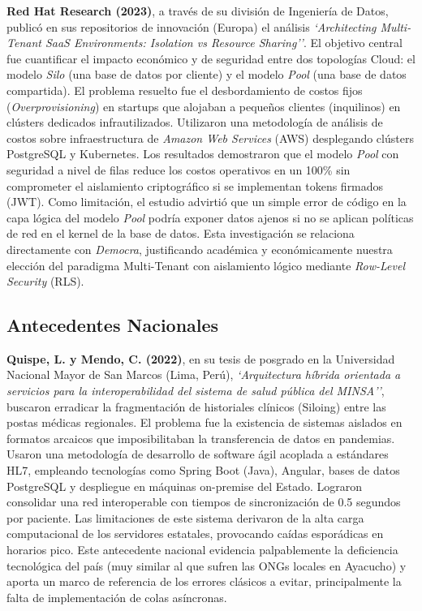 \documentclass[11pt,a4paper,oneside]{report}
\begin{document}
\textbf{Red Hat Research (2023)}, a trav\'es de su divisi\'on de Ingenier\'ia de Datos, public\'o en sus repositorios de innovaci\'on (Europa) el an\'alisis \textit{`Architecting Multi-Tenant SaaS Environments: Isolation vs Resource Sharing''}. El objetivo central fue cuantificar el impacto econ\'omico y de seguridad entre dos topolog\'ias Cloud: el modelo \textit{Silo} (una base de datos por cliente) y el modelo \textit{Pool} (una base de datos compartida). El problema resuelto fue el desbordamiento de costos fijos (\textit{Overprovisioning}) en startups que alojaban a peque\~nos clientes (inquilinos) en cl\'usters dedicados infrautilizados. Utilizaron una metodolog\'ia de an\'alisis de costos sobre infraestructura de \textit{Amazon Web Services} (AWS) desplegando cl\'usters PostgreSQL y Kubernetes. Los resultados demostraron que el modelo \textit{Pool} con seguridad a nivel de filas reduce los costos operativos en un 100\% sin comprometer el aislamiento criptogr\'afico si se implementan tokens firmados (JWT). Como limitaci\'on, el estudio advirti\'o que un simple error de c\'odigo en la capa l\'ogica del modelo \textit{Pool} podr\'ia exponer datos ajenos si no se aplican pol\'iticas de red en el kernel de la base de datos. Esta investigaci\'on se relaciona directamente con \textit{Democra}, justificando acad\'emica y econ\'omicamente nuestra elecci\'on del paradigma Multi-Tenant con aislamiento l\'ogico mediante \textit{Row-Level Security} (RLS).

\subsection{Antecedentes Nacionales}

\textbf{Quispe, L. y Mendo, C. (2022)}, en su tesis de posgrado en la Universidad Nacional Mayor de San Marcos (Lima, Per\'u), \textit{`Arquitectura h\'ibrida orientada a servicios para la interoperabilidad del sistema de salud p\'ublica del MINSA''}, buscaron erradicar la fragmentaci\'on de historiales cl\'inicos (Siloing) entre las postas m\'edicas regionales. El problema fue la existencia de sistemas aislados en formatos arcaicos que imposibilitaban la transferencia de datos en pandemias. Usaron una metodolog\'ia de desarrollo de software \'agil acoplada a est\'andares HL7, empleando tecnolog\'ias como Spring Boot (Java), Angular, bases de datos PostgreSQL y despliegue en m\'aquinas on-premise del Estado. Lograron consolidar una red interoperable con tiempos de sincronizaci\'on de 0.5 segundos por paciente. Las limitaciones de este sistema derivaron de la alta carga computacional de los servidores estatales, provocando ca\'idas espor\'adicas en horarios pico. Este antecedente nacional evidencia palpablemente la deficiencia tecnol\'ogica del pa\'is (muy similar al que sufren las ONGs locales en Ayacucho) y aporta un marco de referencia de los errores cl\'asicos a evitar, principalmente la falta de implementaci\'on de colas as\'incronas.
\end{document}
